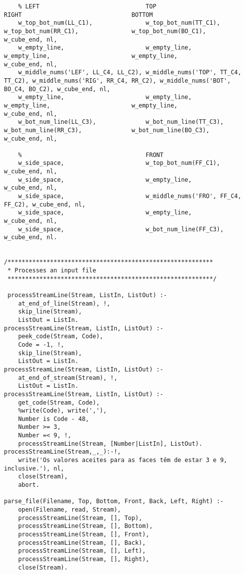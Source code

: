 \begin{lstlisting}
	% LEFT                              TOP                                 RIGHT                               BOTTOM
	w_top_bot_num(LL_C1),               w_top_bot_num(TT_C1),               w_top_bot_num(RR_C1),               w_top_bot_num(BO_C1),               w_cube_end, nl,
	w_empty_line,                       w_empty_line,                       w_empty_line,                       w_empty_line,                       w_cube_end, nl,
	w_middle_nums('LEF', LL_C4, LL_C2), w_middle_nums('TOP', TT_C4, TT_C2), w_middle_nums('RIG', RR_C4, RR_C2), w_middle_nums('BOT', BO_C4, BO_C2), w_cube_end, nl,
	w_empty_line,                       w_empty_line,                       w_empty_line,                       w_empty_line,                       w_cube_end, nl,
	w_bot_num_line(LL_C3),              w_bot_num_line(TT_C3),              w_bot_num_line(RR_C3),              w_bot_num_line(BO_C3),              w_cube_end, nl,
	
	%                                   FRONT
	w_side_space,                       w_top_bot_num(FF_C1),               w_cube_end, nl,
	w_side_space,                       w_empty_line,                       w_cube_end, nl,
	w_side_space,                       w_middle_nums('FRO', FF_C4, FF_C2), w_cube_end, nl,
	w_side_space,                       w_empty_line,                       w_cube_end, nl,
	w_side_space,                       w_bot_num_line(FF_C3),              w_cube_end, nl.
	

/**********************************************************
 * Processes an input file
 **********************************************************/

 processStreamLine(Stream, ListIn, ListOut) :-
	at_end_of_line(Stream), !,
	skip_line(Stream),
	ListOut = ListIn.
processStreamLine(Stream, ListIn, ListOut) :-
	peek_code(Stream, Code),
	Code = -1, !,
	skip_line(Stream),
	ListOut = ListIn. 
processStreamLine(Stream, ListIn, ListOut) :-
	at_end_of_stream(Stream), !,
	ListOut = ListIn.
processStreamLine(Stream, ListIn, ListOut) :-
	get_code(Stream, Code),
	%write(Code), write(','),
	Number is Code - 48,
	Number >= 3,
	Number =< 9, !,
	processStreamLine(Stream, [Number|ListIn], ListOut).
processStreamLine(Stream,_,_):-!,
	write('Os valores aceites para as faces têm de estar 3 e 9, inclusive.'), nl,
	close(Stream),
	abort.
	
parse_file(Filename, Top, Bottom, Front, Back, Left, Right) :-
	open(Filename, read, Stream),
	processStreamLine(Stream, [], Top),
	processStreamLine(Stream, [], Bottom),
	processStreamLine(Stream, [], Front),
	processStreamLine(Stream, [], Back),
	processStreamLine(Stream, [], Left),
	processStreamLine(Stream, [], Right),
	close(Stream).
	

\end{lstlisting}
